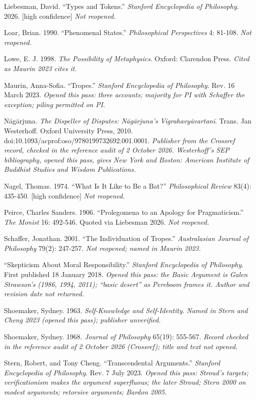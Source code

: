 \documentclass[11pt]{article}
\begin{document}
Liebesman, David. ``Types and Tokens.'' \emph{Stanford Encyclopedia of Philosophy}. 2026. [high confidence] \emph{Not reopened.}

Loar, Brian. 1990. ``Phenomenal States.'' \emph{Philosophical Perspectives} 4: 81-108. \emph{Not reopened.}

Lowe, E. J. 1998. \emph{The Possibility of Metaphysics}. Oxford: Clarendon Press. \emph{Cited as Maurin 2023 cites it.}

Maurin, Anna-Sofia. ``Tropes.'' \emph{Stanford Encyclopedia of Philosophy}. Rev. 16 March 2023. \emph{Opened this pass: three accounts; majority for PI with Schaffer the exception; piling permitted on PI.}

Nāgārjuna. \emph{The Dispeller of Disputes: Nāgārjuna's Vigrahavyāvartanī}. Trans. Jan Westerhoff. Oxford University Press, 2010. doi:10.1093/\allowbreak{}acprof:oso/\allowbreak{}9780199732692.001.0001. \emph{Publisher from the Crossref record, checked in the reference audit of 2 October 2026. Westerhoff's SEP bibliography, opened this pass, gives New York and Boston: American Institute of Buddhist Studies and Wisdom Publications.}

Nagel, Thomas. 1974. ``What Is It Like to Be a Bat?'' \emph{Philosophical Review} 83(4): 435-450. [high confidence] \emph{Not reopened.}

Peirce, Charles Sanders. 1906. ``Prolegomena to an Apology for Pragmaticism.'' \emph{The Monist} 16: 492-546. Quoted via Liebesman 2026. \emph{Not reopened.}

Schaffer, Jonathan. 2001. ``The Individuation of Tropes.'' \emph{Australasian Journal of Philosophy} 79(2): 247-257. \emph{Not reopened; named in Maurin 2023.}

``Skepticism About Moral Responsibility.'' \emph{Stanford Encyclopedia of Philosophy}. First published 18 January 2018. \emph{Opened this pass: the Basic Argument is Galen Strawson's (1986, 1994, 2011); ``basic desert'' as Pereboom frames it. Author and revision date not returned.}

Shoemaker, Sydney. 1963. \emph{Self-Knowledge and Self-Identity}. \emph{Named in Stern and Cheng 2023 (opened this pass); publisher unverified.}

Shoemaker, Sydney. 1968. \emph{Journal of Philosophy} 65(19): 555-567. \emph{Record checked in the reference audit of 2 October 2026 (Crossref); title and text not opened.}

Stern, Robert, and Tony Cheng. ``Transcendental Arguments.'' \emph{Stanford Encyclopedia of Philosophy}. Rev. 7 July 2023. \emph{Opened this pass: Stroud's targets; verificationism makes the argument superfluous; the later Stroud; Stern 2000 on modest arguments; retorsive arguments; Bardon 2005.}
\end{document}
